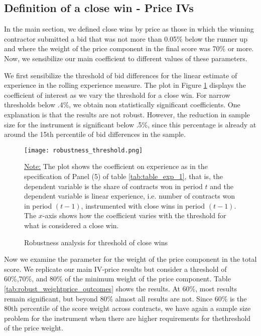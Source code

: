 \subsection{Definition of a close win - Price IVs}
In the main section, we defined close wins by price as those in which the winning contractor submitted a bid that was not more than 0.05\% below the runner up and where the weight of the price component in the final score was 70\% or more. Now, we sensibilize our main coefficient to different values of these parameters.

We first sensibilize the threshold of bid differences for the linear estimate of experience in the rolling experience measure. The plot in Figure \ref{fig:close_wins_robust} displays the coefficient of interest as we vary the threshold for a close win.  For narrow thresholds below .4\%, we obtain non statistically significant coefficients. One explanation is that the results are not robust. However, the reduction in sample size for the instrument is significant below .5\%, since this percentage is already at around the 15th percentile of bid differences in the sample.

 \begin{figure}[H]
         \centering
         \texttt{[image: robustness\_threshold.png]}
         \caption{Robustness analysis for threshold of close wins}
         \label{fig:close_wins_robust}

  \vskip 0.5mm
  {\justifying\footnotesize\underline{Note:} The plot shows the coefficient on experience as in the specification of Panel (5) of table \ref{tab:table_exp_1}, that is, the dependent variable is the share of contracts won in period $t$ and the dependent variable is linear experience, i.e. number of contracts won in period $(t-1)$, instrumented with close wins in period $(t-1)$. The $x$-axis shows how the coefficient varies with the threshold for what is considered a close win.\par}
 \end{figure}

Now we examine the parameter for the weight of the price component in the total score. We replicate our main IV-price results but consider a threshold of 60\%,70\%, and 80\% of the minimum weight of the price component. Table \ref{tab:robust_weightprice_outcomes} shows the results. At 60\%, most results remain significant, but beyond 80\% almost all results are not. Since 60\% is the 80th percentile of the score weight across contracts, we have again a sample size problem for the instrument when there are higher requirements for thethreshold of the price weight.

